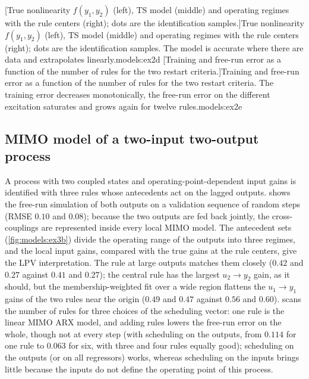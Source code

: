 [True nonlinearity $f(y_1,y_2)$ (left), TS model (middle) and operating regimes with the rule centers (right); dots are the identification samples.]{True nonlinearity $f(y_1,y_2)$ (left), TS model (middle) and operating regimes with the rule centers (right); dots are the identification samples. The model is accurate where there are data and extrapolates linearly.}{models:ex2d}
[Training and free-run error as a function of the number of rules for the two restart criteria.]{Training and free-run error as a function of the number of rules for the two restart criteria. The training error decreases monotonically, the free-run error on the different excitation saturates and grows again for twelve rules.}{models:ex2e}

\subsection{MIMO model of a two-input two-output process}

A process with two coupled states and operating-point-dependent input gains is identified with three rules whose antecedents act on the lagged outputs.  shows the free-run simulation of both outputs on a validation sequence of random steps (RMSE $0.10$ and $0.08$); because the two outputs are fed back jointly, the cross-couplings are represented inside every local MIMO model. The antecedent sets (\cref{fig:models:ex3b}) divide the operating range of the outputs into three regimes, and the local input gains, compared with the true gains at the rule centers, give the LPV interpretation. The rule at large outputs matches them closely ($0.42$ and $0.27$ against $0.41$ and $0.27$); the central rule has the largest $u_2\to y_2$ gain, as it should, but the membership-weighted fit over a wide region flattens the $u_1\to y_1$ gains of the two rules near the origin ($0.49$ and $0.47$ against $0.56$ and $0.60$).  scans the number of rules for three choices of the scheduling vector: one rule is the linear MIMO ARX model, and adding rules lowers the free-run error on the whole, though not at every step (with scheduling on the outputs, from $0.114$ for one rule to $0.063$ for six, with three and four rules equally good); scheduling on the outputs (or on all regressors) works, whereas scheduling on the inputs brings little because the inputs do not define the operating point of this process.

